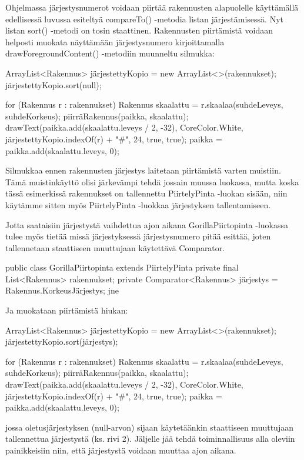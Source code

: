 Ohjelmassa järjestysnumerot voidaan piirtää rakennusten alapuolelle käyttämällä
edellisessä luvussa esiteltyä compareTo() -metodia listan järjestämisessä. Nyt
listan sort() -metodi on tosin staattinen. Rakennusten piirtämistä voidaan
helposti muokata näyttämään järjestysnumero kirjoittamalla
drawForegroundContent() -metodiin muunneltu silmukka:

\begin{javacode}
ArrayList<Rakennus> järjestettyKopio = new ArrayList<>(rakennukset);
järjestettyKopio.sort(null);

for (Rakennus r : rakennukset) {
	Rakennus skaalattu = r.skaalaa(suhdeLeveys, suhdeKorkeus);
	piirräRakennus(paikka, skaalattu);
	drawText(paikka.add(skaalattu.leveys / 2, -32), CoreColor.White,
		järjestettyKopio.indexOf(r) + "#", 24, true, true); paikka =
		paikka.add(skaalattu.leveys, 0); 
}
\end{javacode}

Silmukkaa ennen rakennusten järjestys laitetaan piirtämistä varten muistiin.
Tämä muistinkäyttö olisi järkevämpi tehdä jossain muussa luokassa, mutta koska
tässä esimerkissä rakennukset on tallennettu PiirtelyPinta -luokan sisään, niin
käytämme sitten myös PiirtelyPinta -luokkaa järjestyksen tallentamiseen.

Jotta saataisiin järjestystä vaihdettua ajon aikana GorillaPiirtopinta -luokassa
tulee myös tietää missä järjestyksessä järjestysnumero pitää esittää, joten
tallennetaan staattiseen muuttujaan käytettävä Comparator.

\begin{javacode}
public class GorillaPiirtopinta extends PiirtelyPinta {
    private final List<Rakennus> rakennukset;
    private Comparator<Rakennus> järjestys = Rakennus.KorkeusJärjestys;
    jne
}
\end{javacode}

Ja muokataan piirtämistä hiukan:

\begin{javacode}
ArrayList<Rakennus> järjestettyKopio = new ArrayList<>(rakennukset);
järjestettyKopio.sort(järjestys);

for (Rakennus r : rakennukset) {
	Rakennus skaalattu = r.skaalaa(suhdeLeveys, suhdeKorkeus);
	piirräRakennus(paikka, skaalattu);
	drawText(paikka.add(skaalattu.leveys / 2, -32), CoreColor.White,
		järjestettyKopio.indexOf(r) + "#", 24, true, true); paikka =
		paikka.add(skaalattu.leveys, 0); 
}
\end{javacode}

jossa oletusjärjestyksen (null-arvon) sijaan käytetäänkin staattiseen muuttujaan
tallennettua järjestystä (ks. rivi 2). Jäljelle jää tehdä toiminnallisuus alla
oleviin painikkeisiin niin, että järjestystä voidaan muuttaa ajon aikana.

